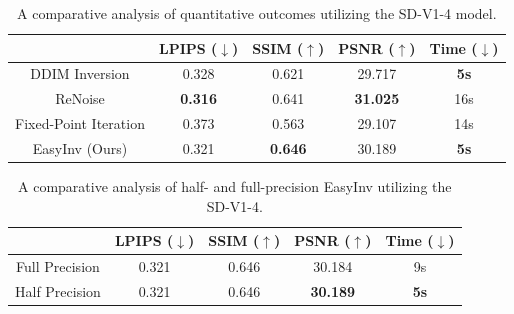 \documentclass[letterpaper]{article} %
\begin{document}



\begin{table}[!t]\tabcolsep=0.4cm
\caption{A comparative analysis of quantitative outcomes utilizing the SD-V1-4 model.}
\centering
 \begin{tabular}{c c c c c} 
 \toprule
 & LPIPS ($\downarrow$) & SSIM ($\uparrow$) & PSNR ($\uparrow$) & Time ($\downarrow$) \\ [0.5ex] 
 \midrule
 DDIM Inversion & 0.328  & 0.621 & 29.717 & \textbf{5s}\\
 \hline
 ReNoise & \textbf{0.316} & 0.641 & \textbf{31.025} & 16s\\
 \hline
 Fixed-Point Iteration & 0.373 & 0.563 & 29.107 & 14s\\
 \hline
 EasyInv (Ours) & 0.321 & \textbf{0.646} & 30.189 & \textbf{5s} \\
 \bottomrule
\end{tabular}
\label{quantitative}
\end{table}


\begin{table}[!tb]\tabcolsep=0.4cm
\caption{A comparative analysis of half- and full-precision EasyInv utilizing the SD-V1-4.}
\centering
 \begin{tabular}{c c c c c} 
 \toprule
 & LPIPS ($\downarrow$) & SSIM ($\uparrow$) & PSNR ($\uparrow$) & Time ($\downarrow$) \\ [0.5ex] 
 \midrule
 Full Precision & 0.321 & 0.646 & 30.184 & 9s\\
 \hline
 Half Precision & 0.321 & 0.646 & \textbf{30.189} & \textbf{5s} \\
 \bottomrule
\end{tabular}
\label{precision_table}
\end{table}
\end{document}
